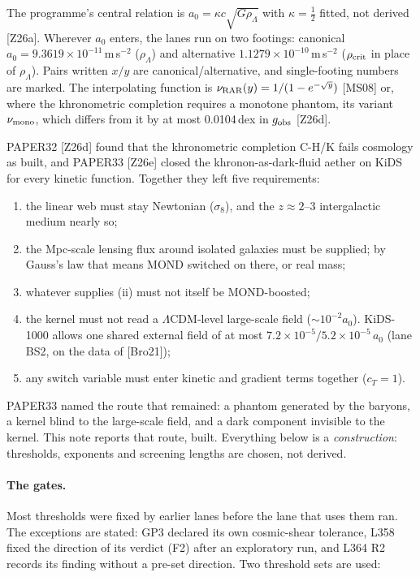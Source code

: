 \documentclass[10pt]{article}
\begin{document}
The programme's central relation is $a_0=\kappa c\sqrt{G\rho_\Lambda}$ with $\kappa=\tfrac12$ fitted, not derived [Z26a]. Wherever $a_0$ enters, the lanes run on two footings: canonical $a_0=9.3619\times10^{-11}$\,m\,s$^{-2}$ ($\rho_\Lambda$) and alternative $1.1279\times10^{-10}$\,m\,s$^{-2}$ ($\rho_{\rm crit}$ in place of $\rho_\Lambda$). Pairs written $x/y$ are canonical/alternative, and single-footing numbers are marked. The interpolating function is $\nu_{\rm RAR}(y)=1/(1-e^{-\sqrt y})$ [MS08] or, where the khronometric completion requires a monotone phantom, its variant $\nu_{\rm mono}$, which differs from it by at most 0.0104\,dex in $g_{\rm obs}$ [Z26d].

PAPER32 [Z26d] found that the khronometric completion C-H/K fails cosmology as built, and PAPER33 [Z26e] closed the khronon-as-dark-fluid aether on KiDS for every kinetic function. Together they left five requirements:
\begin{enumerate}[label=(\roman*)]
\item the linear web must stay Newtonian ($\sigma_8$), and the $z\approx2$--3 intergalactic medium nearly so;
\item the Mpc-scale lensing flux around isolated galaxies must be supplied; by Gauss's law that means MOND switched on there, or real mass;
\item whatever supplies (ii) must not itself be MOND-boosted;
\item the kernel must not read a $\Lambda$CDM-level large-scale field ($\sim10^{-2}a_0$). KiDS-1000 allows one shared external field of at most $7.2\times10^{-5}/5.2\times10^{-5}\,a_0$ (lane BS2, on the data of [Bro21]);
\item any switch variable must enter kinetic and gradient terms together ($c_T=1$).
\end{enumerate}
PAPER33 named the route that remained: a phantom generated by the baryons, a kernel blind to the large-scale field, and a dark component invisible to the kernel. This note reports that route, built. Everything below is a \emph{construction}: thresholds, exponents and screening lengths are chosen, not derived.

\paragraph{The gates.} Most thresholds were fixed by earlier lanes before the lane that uses them ran. The exceptions are stated: GP3 declared its own cosmic-shear tolerance, L358 fixed the direction of its verdict (F2) after an exploratory run, and L364 R2 records its finding without a pre-set direction. Two threshold sets are used:
\smallskip
\end{document}
